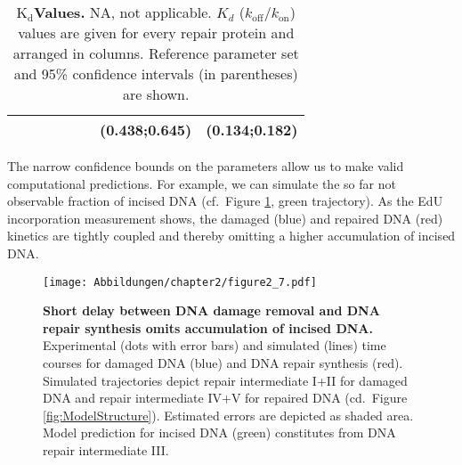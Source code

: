 \begin{table}[t]
\begin{adjustwidth}{-1 cm}{}
{\begin{tabular}{p{2cm}ccccccc}
	&                               &                              &                           &                          &                            &  (0.438;0.645)  & (0.134;0.182)  \\
	\hline
\end{tabular}}
\caption{\textbf{$\text{K}_{\text{d}}$Values.} NA, not applicable. $K_d$ ($k_{\text{off}}/k_{\text{on}}$) values are given for every repair protein and arranged in columns. Reference parameter set and 95\% confidence intervals (in parentheses) are shown.}\label{tab:KdValues}
\end{adjustwidth}
\end{table}

The narrow confidence bounds on the parameters allow us to make valid computational predictions. For example, we can simulate the so far not observable fraction of incised DNA (cf.\ Figure \ref{fig:ModelFit_intermed}, green trajectory). As the EdU incorporation measurement shows, the damaged (blue) and repaired DNA (red) kinetics are tightly coupled and thereby omitting a higher accumulation of incised DNA. 

\begin{figure}[htbp]
	\begin{center}
		\texttt{[image: Abbildungen/chapter2/figure2\_7.pdf]}
		\caption{\textbf{Short delay between DNA damage removal and DNA repair synthesis omits accumulation of incised DNA.} Experimental (dots with error bars) and simulated (lines) time courses for damaged DNA (blue) and DNA repair synthesis (red). Simulated trajectories depict repair intermediate I+II for damaged DNA and repair intermediate IV+V for repaired DNA (cd.\ Figure \ref{fig:ModelStructure}). Estimated errors are depicted as shaded area. Model prediction for incised DNA (green) constitutes from DNA repair intermediate III. }
		\label{fig:ModelFit_intermed}
	\end{center}
\end{figure}


  